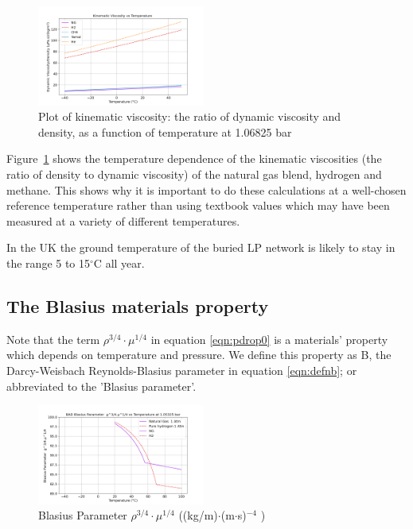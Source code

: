 \documentclass[5p]{elsarticle} %
\begin{document}
\begin{figure}[htb]
\centering
\includegraphics[width=0.49\textwidth]{peng_re.png}
\caption{Plot of kinematic viscosity: the ratio of dynamic viscosity and density, as a function of temperature at 1.06825 bar}
\label{fig:peng_re}
\end{figure}

Figure~\ref{fig:peng_re} shows the temperature dependence of the kinematic viscosities (the ratio of density to dynamic viscosity) of the natural gas blend, hydrogen and methane. This shows why it is important to do these calculations at a well-chosen reference temperature rather than using textbook values which may have been measured at a variety of different temperatures.

In the UK the ground temperature of the buried LP network is likely to stay in the range 5 to 15$^\circ$C all year\citep{MacKay2008}.

\subsection{The Blasius materials property}
\label{sec:blasiusparam}

Note that the term $\rho^{3/4} \cdot \mu^{1/4}$ in equation \eqref{eqn:pdrop0} is a materials' property which depends on temperature and pressure. We define this property as B, the Darcy-Weisbach Reynolds-Blasius parameter in equation \eqref{eqn:defnb}; or abbreviated to the 'Blasius parameter'.

\begin{figure}[htb]
\centering
\includegraphics[width=0.49\textwidth]{peng_bf.png}
\caption{Blasius Parameter $\rho^{3/4} \cdot \mu^{1/4}$ ((kg/m)$\cdot$(m$\cdot$s)$^{-4}$ )}
\label{fig:blasiusparam0}
\end{figure}
\end{document}
